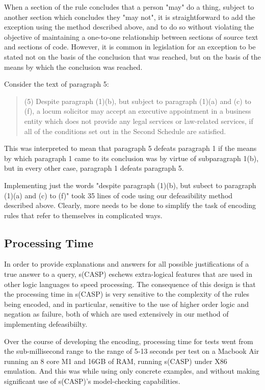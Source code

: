 \documentclass[sigconf]{acmart}
\begin{document}
When a section of the rule concludes that a person "may" do a thing, subject to another section which
concludes they "may not", it is straightforward to add the exception using the method described above, and to do so without violating the objective of maintaining
a one-to-one relationship between sections of source text and sections of code.
However, it is common in legislation for an exception to be stated not on the basis of the conclusion
that was reached, but on the basis of the means by which the conclusion was reached.

Consider the text of paragraph 5:

\begin{quote}
    (5)  Despite paragraph (1)(b), but subject to paragraph (1)(a) and (c) to (f), a locum solicitor may accept an executive appointment in a business entity which does not provide any legal services or law-related services, if all of the conditions set out in the Second Schedule are satisfied.
\end{quote}

This was interpreted to mean that paragraph 5 defeats paragraph 1 if the means by which paragraph 1 came to
its conclusion was by virtue of subparagraph 1(b), but in every other case, paragraph 1 defeats paragraph 5.

Implementing just the words "despite paragraph (1)(b), but subect to paragraph
(1)(a) and (c) to (f)" took 35 lines of code using our defeasibility method
described above. Clearly, more needs to be done to simplify the task of encoding rules
that refer to themselves in complicated ways.

\subsection{Processing Time}
In order to provide explanations and answers for all possible justifications of a true answer to a query, s(CASP)
eschews extra-logical features that are used in other logic
languages to speed processing. The consequence of this design is that the processing time in s(CASP) is very sensitive to the complexity of the rules
being encoded, and in particular, sensitive to the use of higher order logic and negation as failure,
both of which are used extensively in our method of implementing defeasibiilty.

Over the course of developing the encoding, processing time for tests went from the sub-millisecond range to
the range of 5-13 seconds per test on a Macbook Air running an 8 core M1 and 16GB of RAM, running s(CASP)
under X86 emulation. And this was while using only concrete examples, and without
making significant use of s(CASP)'s model-checking capabilities.
\end{document}
